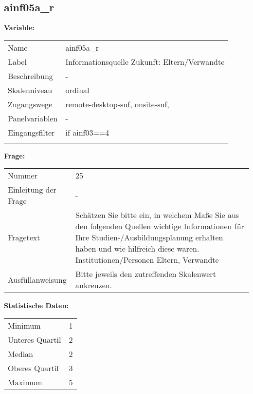 	
	
	\subsection{ainf05a\_r}
	\label{subSection:ainf05a_r}

	\noindent\textbf{Variable:}\\
		\begin{tabular}{lL{11.3cm}}
			\label{tableVariable:ainf05a_r}
			Name & ainf05a\_r \\
			Label & Informationsquelle Zukunft: Eltern/Verwandte \\
			Beschreibung & - \\
			Skalenniveau & ordinal \\
			Zugangswege &
				remote-desktop-suf,
				onsite-suf,
 \\
			Panelvariablen & -
			 \\
			Eingangsfilter & if ainf03==4 \\
 \\
		\end{tabular}

		\vspace*{1 cm}
		\noindent\textbf{Frage:}\\
		\begin{tabular}{lL{11.3cm}}
			\label{tableQuestion:ainf05a_r}
			Nummer & 25 \\
			Einleitung der Frage & - \\
			Fragetext & Schätzen Sie bitte ein, in welchem Maße Sie aus den folgenden Quellen wichtige Informationen für Ihre Studien-/Ausbildungsplanung erhalten haben und wie hilfreich diese waren.
Institutionen/Personen
Eltern, Verwandte \\
			Ausfüllanweisung & Bitte jeweils den zutreffenden Skalenwert ankreuzen. \\
		\end{tabular}


		\vspace*{1 cm}
		\noindent\textbf{Statistische Daten:}\\
			\begin{tabular}{ll}
				\label{tableStatistics:ainf05a_r}
					Minimum & 1 \\
					Unteres Quartil & 2 \\
					Median & 2 \\
					Oberes Quartil & 3 \\
					Maximum & 5 \\
			\end{tabular}



